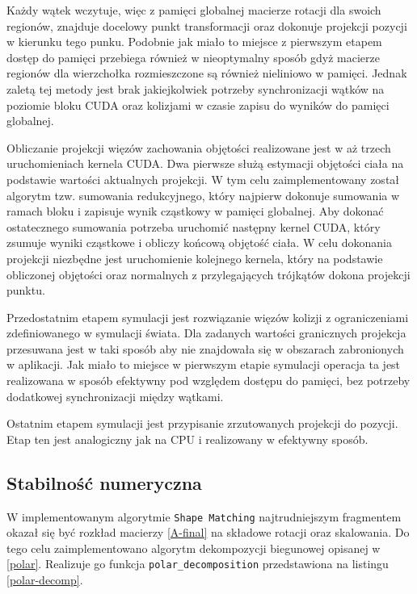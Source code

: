 {Każdy wątek wczytuje, więc z pamięci globalnej macierze rotacji dla swoich regionów, znajduje
docelowy punkt transformacji oraz dokonuje projekcji pozycji w kierunku tego
punku. Podobnie jak miało to miejsce z pierwszym etapem dostęp do pamięci
przebiega również w nieoptymalny sposób gdyż macierze regionów dla wierzchołka rozmieszczone są również
nieliniowo w pamięci. Jednak zaletą tej metody jest brak jakiejkolwiek potrzeby
synchronizacji wątków na poziomie bloku CUDA oraz kolizjami w czasie zapisu do
wyników do pamięci globalnej.
 
Obliczanie projekcji więzów zachowania objętości realizowane jest w aż trzech
uruchomieniach kernela CUDA. Dwa pierwsze służą estymacji objętości ciała na
podstawie wartości aktualnych projekcji. W tym celu zaimplementowany został
algorytm tzw. sumowania redukcyjnego, który najpierw dokonuje sumowania w ramach
bloku i zapisuje wynik cząstkowy w pamięci globalnej. Aby dokonać ostatecznego
sumowania potrzeba uruchomić następny kernel CUDA, który zsumuje wyniki
cząstkowe i obliczy końcową objętość ciała. W celu dokonania projekcji niezbędne
jest uruchomienie kolejnego kernela, który na podstawie obliczonej objętości
oraz normalnych z przylegających trójkątów dokona projekcji punktu.

Przedostatnim etapem symulacji jest rozwiązanie więzów kolizji z ograniczeniami
zdefiniowanego w symulacji świata. Dla zadanych wartości granicznych projekcja
przesuwana jest w taki sposób aby nie znajdowała się w obszarach zabronionych w
aplikacji. Jak miało to miejsce w pierwszym etapie symulacji operacja ta jest
realizowana w sposób efektywny pod względem dostępu do pamięci, bez potrzeby
dodatkowej synchronizacji między wątkami.

Ostatnim etapem symulacji jest przypisanie zrzutowanych projekcji do pozycji.
Etap ten jest analogiczny jak na CPU i realizowany w efektywny sposób.

\subsection{Stabilność numeryczna}

W implementowanym algorytmie \texttt{Shape Matching} najtrudniejszym fragmentem
okazał się być rozkład macierzy \ref{A-final} na składowe rotacji oraz
skalowania. Do tego celu zaimplementowano algorytm dekompozycji biegunowej
opisanej w \ref{polar}. Realizuje go funkcja \texttt{polar\_decomposition}
przedstawiona na listingu \ref{polar-decomp}.

}
